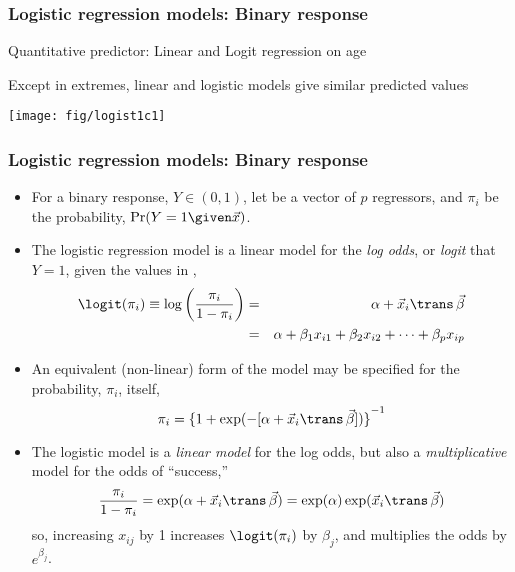 \begin{frame}
  \frametitle{Logistic regression models: Binary response}
Quantitative predictor: Linear and Logit regression on age
  \begin{itemize*}
	\item Except in extremes, linear
and logistic models give similar predicted values
	\end{itemize*}
\begin{center}
   \texttt{[image: fig/logist1c1]}
\end{center}

\end{frame}

\begin{frame}
  \frametitle{Logistic regression models: Binary response}
  \begin{itemize}
	\item For a binary response, $Y \in (0,1)$, 
	let 
	 be a vector of $p$ regressors, and  
	$\pi_i$ be the probability, $\Pr (Y=1 \given \vec{x})$. 
	\item The logistic regression
	model is a linear model for the \emph{log odds}, or \emph{logit}
	that $Y=1$, given the values in ,
\begin{eqnarray*}
  \logit ( \pi_{i}) \equiv \log \left( \frac{\pi_i}{1 - \pi_i}  \right)
   &=& \alpha + \vec{x}_{i}\trans \,  \vec{\beta} \\ %
   &=& \alpha + \beta_1 x_{i1} + \beta_2 x_{i2} + \cdots + \beta_p x_{ip}
   \nonumber
\end{eqnarray*}
	\item An equivalent (non-linear) form of the model may be specified for
	the probability,  $\pi_i$, itself,
\begin{equation*}
    \pi_i = {\{ 1 + \exp ( -[\alpha + \vec{x}_{i}\trans \,  \vec{\beta} ] ) \}}^{-1}
\end{equation*}

	\item The logistic model is a \emph{linear model} for the log odds, but also a
	\emph{multiplicative} model for the odds of ``success,''
\begin{equation*}
\frac{\pi_i}{1 - \pi_i} = \exp( \alpha + \vec{x}_{i}\trans \,  \vec{\beta} )
   = \exp(\alpha) \exp ( \vec{x}_{i}\trans \,  \vec{\beta} )
\end{equation*}
so, increasing $x_{ij}$ by 1 increases $\logit ( \pi_{i})$ by $\beta_j$,
and multiplies the odds by $e^{\beta_j}$.
  \end{itemize}
\end{frame}

